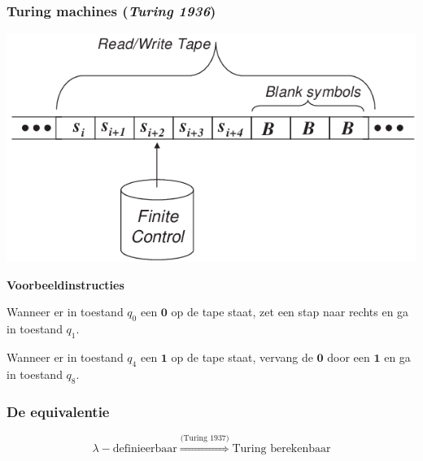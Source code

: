 \documentclass[handout]{beamer}
\begin{document}
\begin{frame}{}
    \frametitle{Turing machines (\emph{Turing 1936})}
    \begin{center}
        \includegraphics[height=0.3\textheight]{tm.png}
    \end{center}    
    \textbf{Voorbeeldinstructies}
    \begin{description}
        \item<2->[$q_0\mathbf{0}Rq_1$] Wanneer er in toestand $q_0$ een $\mathbf{0}$ op 
        de tape staat, zet een stap naar rechts en ga in toestand $q_1$.
        \item<3->[$q_4\mathbf{1}\mathbf{0}q_8$] Wanneer er in toestand $q_4$ een $\mathbf{1}$
        op de tape staat, vervang de $\mathbf{0}$ door een $\mathbf{1}$ en ga in toestand $q_8$.
    \end{description}
\end{frame}

\begin{frame}
    \frametitle{De equivalentie}

    $$\lambda-\text{definieerbaar} \stackrel{\scriptscriptstyle \text{(Turing 1937)}}{\Longrightarrow} \text{Turing berekenbaar}$$


\end{frame}
\end{document}
